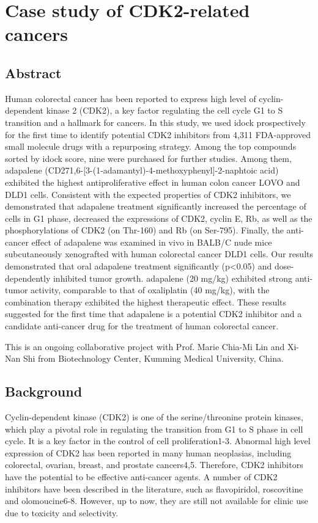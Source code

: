 \chapter{Case study of CDK2-related cancers}
\label{cdk2}

\section{Abstract}

Human colorectal cancer has been reported to express high level of cyclin-dependent kinase 2 (CDK2), a key factor regulating the cell cycle G1 to S transition and a hallmark for cancers. In this study, we used idock prospectively for the first time to identify potential CDK2 inhibitors from 4,311 FDA-approved small molecule drugs with a repurposing strategy. Among the top compounds sorted by idock score, nine were purchased for further studies. Among them, adapalene (CD271,6-[3-(1-adamantyl)-4-methoxyphenyl]-2-naphtoic acid) exhibited the highest antiproliferative effect in human colon cancer LOVO and DLD1 cells. Consistent with the expected properties of CDK2 inhibitors, we demonstrated that adapalene treatment significantly increased the percentage of cells in G1 phase, decreased the expressions of CDK2, cyclin E, Rb, as well as the phosphorylations of CDK2 (on Thr-160) and Rb (on Ser-795). Finally, the anti-cancer effect of adapalene was examined in vivo in BALB/C nude mice subcutaneously xenografted with human colorectal cancer DLD1 cells. Our results demonstrated that oral adapalene treatment significantly (p<0.05) and dose-dependently inhibited tumor growth. adapalene (20 mg/kg) exhibited strong anti-tumor activity, comparable to that of oxaliplatin (40 mg/kg), with the combination therapy exhibited the highest therapeutic effect. These results suggested for the first time that adapalene is a potential CDK2 inhibitor and a candidate anti-cancer drug for the treatment of human colorectal cancer.

This is an ongoing collaborative project with Prof. Marie Chia-Mi Lin and Xi-Nan Shi from Biotechnology Center, Kumming Medical University, China.

\section{Background}

Cyclin-dependent kinase (CDK2) is one of the serine/threonine protein kinases, which play a pivotal role in regulating the transition from G1 to S phase in cell cycle. It is a key factor in the control of cell proliferation1-3. Abnormal high level expression of CDK2 has been reported in many human neoplasias, including colorectal, ovarian, breast, and prostate cancers4,5. Therefore, CDK2 inhibitors have the potential to be effective anti-cancer agents. A number of CDK2 inhibitors have been described in the literature, such as flavopiridol, roscovitine and olomoucine6-8. However, up to now, they are still not available for clinic use due to toxicity and selectivity.

